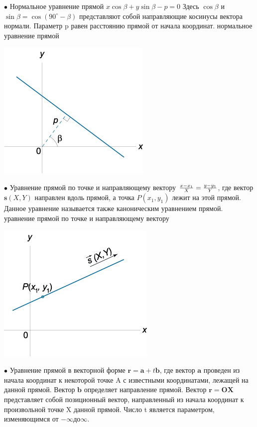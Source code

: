 \documentclass[oneside]{book}
\begin{document}
\begin{enumerate}
\begin{itemize}
\begin{enumerate}
$\bullet$ Нормальное уравнение прямой  
$x\cos \beta + y\sin \beta - p = 0$
Здесь $\cos \beta$ и $\sin\beta = \cos \left( {90^\circ - \beta} \right)$ представляют собой направляющие косинусы вектора нормали. Параметр p равен расстоянию прямой от начала координат.
нормальное уравнение прямой
\begin{center}
\includegraphics[scale=0.4]{./pics/8.jpg}
\end{center}

$\bullet$ Уравнение прямой по точке и направляющему вектору  
$\large\frac{{x - {x_1}}}{X}\normalsize = \large\frac{{y - {y_1}}}{Y}\normalsize$,
где вектор $\mathbf{s}\left( {X,Y} \right)$ направлен вдоль прямой, а точка $P\left( {{x_1},{y_1}} \right)$ лежит на этой прямой. Данное уравнение называется также каноническим уравнением прямой.
уравнение прямой по точке и направляющему вектору

\begin{center}
\includegraphics[scale=0.4]{./pics/9.jpg}
\end{center}

$\bullet$ Уравнение прямой в векторной форме
$\mathbf{r}= \mathbf{a} + t\mathbf{b}$,
где вектор $\mathbf{a}$ проведен из начала координат к некоторой точке A с известными координатами, лежащей на данной прямой. Вектор $\mathbf{b}$ определяет направление прямой. Вектор $\mathbf{r} = \mathbf{OX}$ представляет собой позиционный вектор, направленный из начала координат к произвольной точке X данной прямой. Число t является параметром, изменяющимся от $- \infty $до$ \infty$.


\end{enumerate}
\end{itemize}
\end{enumerate}
\end{document}
